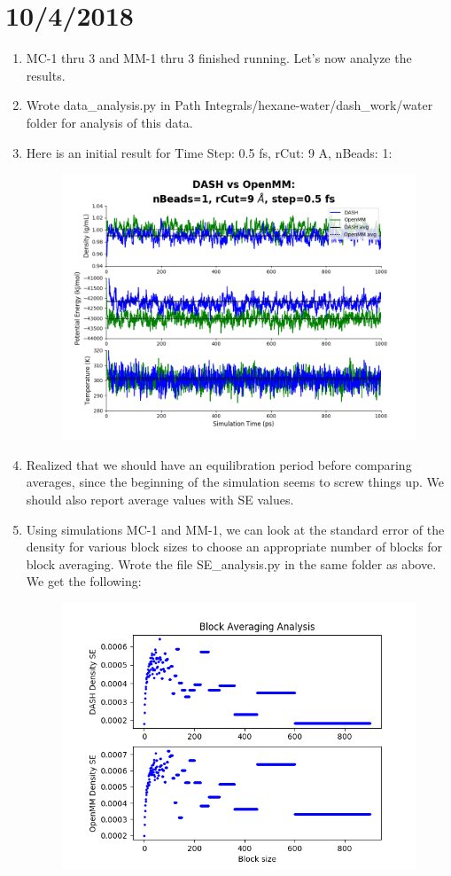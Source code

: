 \documentclass[12pt,reqno]{amsart}
\numberwithin{equation}{section}
\begin{document}
\section{10/4/2018}
\begin{enumerate}
\item MC-1 thru 3 and MM-1 thru 3 finished running.  Let's now analyze the results.  
\item Wrote data\_analysis.py in Path Integrals/hexane-water/dash\_work/water folder for analysis of this data.  
\item Here is an initial result for Time Step: 0.5 fs, rCut: 9 A, nBeads: 1:
\begin{figure}[H]
\centering
\includegraphics[scale=0.4]{MC-MM-nBead1-rCut9-ts05}
\end{figure}
\item Realized that we should have an equilibration period before comparing averages, since the beginning of the simulation seems to screw things up.  We should also report average values with SE values.  
\item Using simulations MC-1 and MM-1, we can look at the standard error of the density for various block sizes to choose an appropriate number of blocks for block averaging.  Wrote the file SE\_analysis.py in the same folder as above.  We get the following:
\begin{figure}[H]
\centering
\includegraphics[scale=0.4]{block_averaging_DASH-vs-OpenMM}

\end{figure}
\end{enumerate}
\end{document}
